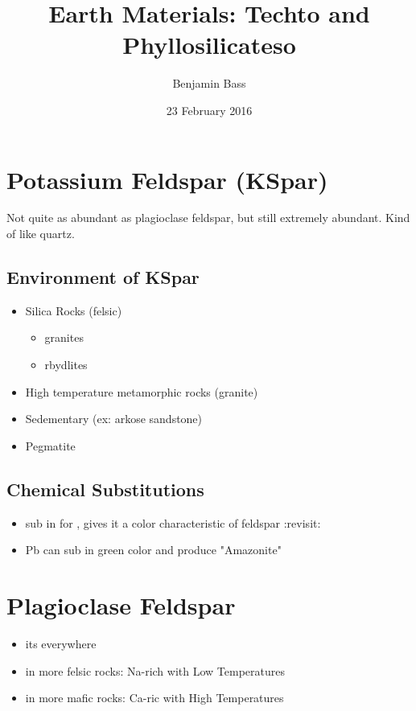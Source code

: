 \documentclass[11pt]{article}
\author{Benjamin Bass}
\date{23 February 2016}
\title{Earth Materials: Techto and Phyllosilicateso}
\begin{document}
\maketitle
\tableofcontents

\pagebreak

\section{Potassium Feldspar (KSpar)}
\label{sec-1}
Not quite as abundant as plagioclase feldspar, but still extremely abundant.
Kind of like quartz.
\subsection{Environment of KSpar}
\label{sec-1-1}
\begin{itemize}
\item Silica Rocks (felsic)
\begin{itemize}
\item granites
\item rbydlites
\end{itemize}
\item High temperature metamorphic rocks (granite)
\item Sedementary (ex: arkose sandstone)
\item Pegmatite
\end{itemize}
\subsection{Chemical Substitutions}
\label{sec-1-2}
\begin{itemize}
\item {} sub in for , gives it a color characteristic of feldspar :revisit:
\item Pb can sub in green color and produce "Amazonite"
\end{itemize}

\section{Plagioclase Feldspar}
\label{sec-2}
\begin{itemize}
\item its everywhere
\item in more felsic rocks: Na-rich with Low Temperatures
\item in more mafic rocks: Ca-ric with High Temperatures
\end{itemize}
\end{document}

